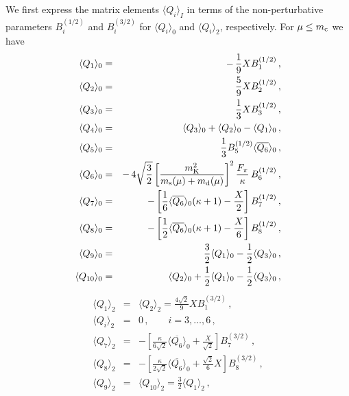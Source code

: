 We first express the matrix elements
$\langle Q_i \rangle_I$ in terms of the non-perturbative parameters
$B_i^{(1/2)}$ and $B_i^{(3/2)}$ for $\langle Q_i \rangle_0$ and
$\langle Q_i \rangle_2$, respectively. For $\mu \le m_{\rm c}$ we have
\cite{burasetal:92d}
\begin{eqnarray}
\langle Q_1 \rangle_0 &=& -\,\frac{1}{9} X B_1^{(1/2)} \, ,
\label{eq:Q10} \\
\langle Q_2 \rangle_0 &=&  \frac{5}{9} X B_2^{(1/2)} \, ,
\label{eq:Q20} \\
\langle Q_3 \rangle_0 &=&  \frac{1}{3} X B_3^{(1/2)} \, ,
\label{eq:Q30} \\
\langle Q_4 \rangle_0 &=&  \langle Q_3 \rangle_0 + \langle Q_2 \rangle_0
                          -\langle Q_1 \rangle_0 \, ,
\label{eq:Q40} \\
\langle Q_5 \rangle_0 &=&  \frac{1}{3} B_5^{(1/2)} 
                           \langle \overline{Q_6} \rangle_0 \, ,
\label{eq:Q50} \\
\langle Q_6 \rangle_0 &=&  -\,4 \sqrt{\frac{3}{2}} 
\left[ \frac{m_{\rm K}^2}{m_{\rm s}(\mu) + m_{\rm d}(\mu)}\right]^2
\frac{F_\pi}{\kappa} \,B_6^{(1/2)} \, ,
\label{eq:Q60} \\
\langle Q_7 \rangle_0 &=& 
- \left[ \frac{1}{6} \langle \overline{Q_6} \rangle_0 (\kappa + 1) 
         - \frac{X}{2} \right] B_7^{(1/2)} \, ,
\label{eq:Q70} \\
\langle Q_8 \rangle_0 &=& 
- \left[ \frac{1}{2} \langle \overline{Q_6} \rangle_0 (\kappa + 1) 
         - \frac{X}{6} \right] B_8^{(1/2)} \, ,
\label{eq:Q80} \\
\langle Q_9 \rangle_0 &=& 
\frac{3}{2} \langle Q_1 \rangle_0 - \frac{1}{2} \langle Q_3 \rangle_0 \, ,
\label{eq:Q90} \\
\langle Q_{10} \rangle_0 &=& 
    \langle Q_2 \rangle_0 + \frac{1}{2} \langle Q_1 \rangle_0
  - \frac{1}{2} \langle Q_3 \rangle_0 \, ,
\label{eq:Q100}
\end{eqnarray}
\begin{eqnarray}
\langle Q_1 \rangle_2 &=& 
\langle Q_2 \rangle_2 = \frac{4 \sqrt{2}}{9} X B_1^{(3/2)} \, ,
\label{eq:Q122} \\
\langle Q_i \rangle_2 &=&  0 \, , \qquad i=3,\ldots,6 \, ,
\label{eq:Q362} \\
\langle Q_7 \rangle_2 &=& 
  -\left[ \frac{\kappa}{6 \sqrt{2}} \langle \overline{Q_6} \rangle_0
          + \frac{X}{\sqrt{2}}
   \right] B_7^{(3/2)} \, ,
\label{eq:Q72} \\
\langle Q_8 \rangle_2 &=& 
  -\left[ \frac{\kappa}{2 \sqrt{2}} \langle \overline{Q_6} \rangle_0
          + \frac{\sqrt{2}}{6} X
   \right] B_8^{(3/2)} \, ,
\label{eq:Q82} \\
\langle Q_9 \rangle_2 &=& 
   \langle Q_{10} \rangle_2 = \frac{3}{2} \langle Q_1 \rangle_2 \, ,
\label{eq:Q9102}
\end{eqnarray}

